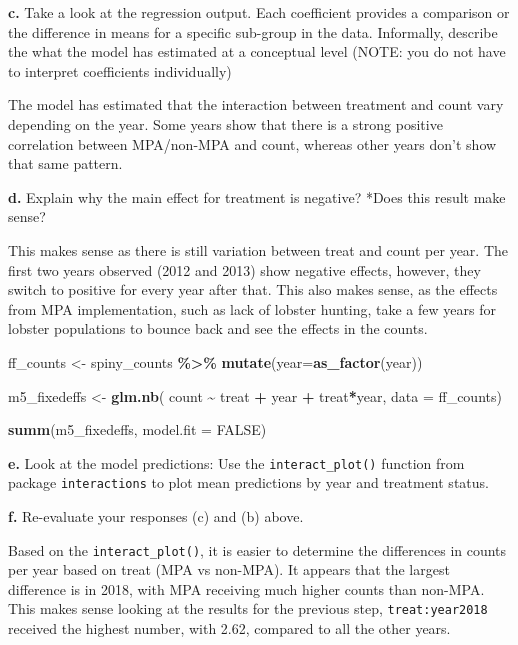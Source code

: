 \documentclass[
]{article}
\newenvironment{Shaded}{\begin{snugshade}}{\end{snugshade}}
\newcommand{\AttributeTok}[1]{\textcolor[rgb]{0.13,0.29,0.53}{#1}}
\newcommand{\ConstantTok}[1]{\textcolor[rgb]{0.56,0.35,0.01}{#1}}
\newcommand{\FunctionTok}[1]{\textcolor[rgb]{0.13,0.29,0.53}{\textbf{#1}}}
\newcommand{\NormalTok}[1]{#1}
\newcommand{\OtherTok}[1]{\textcolor[rgb]{0.56,0.35,0.01}{#1}}
\newcommand{\SpecialCharTok}[1]{\textcolor[rgb]{0.81,0.36,0.00}{\textbf{#1}}}
\begin{document}
\textbf{c.} Take a look at the regression output. Each coefficient
provides a comparison or the difference in means for a specific
sub-group in the data. Informally, describe the what the model has
estimated at a conceptual level (NOTE: you do not have to interpret
coefficients individually)

The model has estimated that the interaction between treatment and count
vary depending on the year. Some years show that there is a strong
positive correlation between MPA/non-MPA and count, whereas other years
don't show that same pattern.

\textbf{d.} Explain why the main effect for treatment is negative? *Does
this result make sense?

This makes sense as there is still variation between treat and count per
year. The first two years observed (2012 and 2013) show negative
effects, however, they switch to positive for every year after that.
This also makes sense, as the effects from MPA implementation, such as
lack of lobster hunting, take a few years for lobster populations to
bounce back and see the effects in the counts.

\begin{Shaded}
\begin{Highlighting}[]
\NormalTok{ff\_counts }\OtherTok{\textless{}{-}}\NormalTok{ spiny\_counts }\SpecialCharTok{\%\textgreater{}\%} 
    \FunctionTok{mutate}\NormalTok{(}\AttributeTok{year=}\FunctionTok{as\_factor}\NormalTok{(year))}
    
\NormalTok{m5\_fixedeffs }\OtherTok{\textless{}{-}} \FunctionTok{glm.nb}\NormalTok{(}
\NormalTok{    count }\SpecialCharTok{\textasciitilde{}} 
\NormalTok{        treat }\SpecialCharTok{+}
\NormalTok{        year }\SpecialCharTok{+}
\NormalTok{        treat}\SpecialCharTok{*}\NormalTok{year,}
    \AttributeTok{data =}\NormalTok{ ff\_counts)}

\FunctionTok{summ}\NormalTok{(m5\_fixedeffs, }\AttributeTok{model.fit =} \ConstantTok{FALSE}\NormalTok{)}
\end{Highlighting}
\end{Shaded}

\textbf{e.} Look at the model predictions: Use the
\texttt{interact\_plot()} function from package \texttt{interactions} to
plot mean predictions by year and treatment status.

\textbf{f.} Re-evaluate your responses (c) and (b) above.

Based on the \texttt{interact\_plot()}, it is easier to determine the
differences in counts per year based on treat (MPA vs non-MPA). It
appears that the largest difference is in 2018, with MPA receiving much
higher counts than non-MPA. This makes sense looking at the results for
the previous step, \texttt{treat:year2018} received the highest number,
with 2.62, compared to all the other years.
\end{document}
